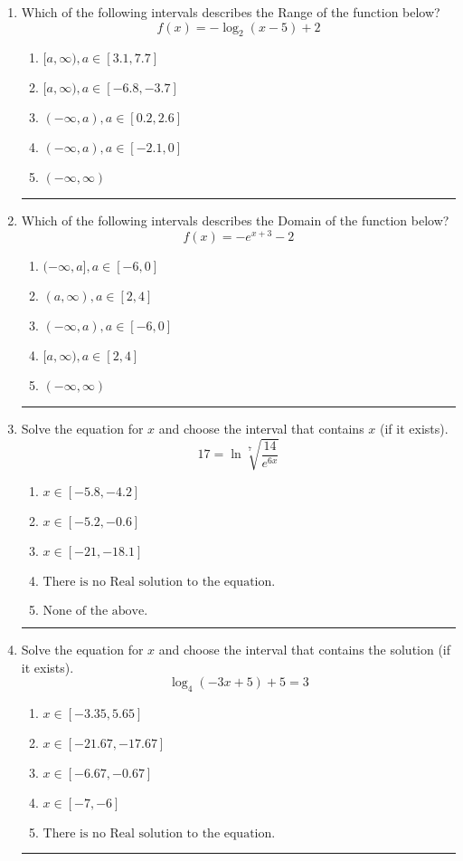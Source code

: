 \documentclass[14pt]{extbook}
\newcommand{\litem}[1]{\item#1\hspace*{-1cm}\rule{\textwidth}{0.4pt}}
\begin{document}
\begin{enumerate}
{\begin{enumerate}[label=\Alph*.]
\end{enumerate} }
\litem{
Which of the following intervals describes the Range of the function below?\[ f(x) = -\log_2{(x-5)}+2 \]\begin{enumerate}[label=\Alph*.]
\item \( [a, \infty), a \in [3.1, 7.7] \)
\item \( [a, \infty), a \in [-6.8, -3.7] \)
\item \( (-\infty, a), a \in [0.2, 2.6] \)
\item \( (-\infty, a), a \in [-2.1, 0] \)
\item \( (-\infty, \infty) \)

\end{enumerate} }
\litem{
Which of the following intervals describes the Domain of the function below?\[ f(x) = -e^{x+3}-2 \]\begin{enumerate}[label=\Alph*.]
\item \( (-\infty, a], a \in [-6, 0] \)
\item \( (a, \infty), a \in [2, 4] \)
\item \( (-\infty, a), a \in [-6, 0] \)
\item \( [a, \infty), a \in [2, 4] \)
\item \( (-\infty, \infty) \)

\end{enumerate} }
\litem{
 Solve the equation for $x$ and choose the interval that contains $x$ (if it exists).\[  17 = \ln{\sqrt[7]{\frac{14}{e^{6x}}}} \]\begin{enumerate}[label=\Alph*.]
\item \( x \in [-5.8, -4.2] \)
\item \( x \in [-5.2, -0.6] \)
\item \( x \in [-21, -18.1] \)
\item \( \text{There is no Real solution to the equation.} \)
\item \( \text{None of the above.} \)

\end{enumerate} }
\litem{
Solve the equation for $x$ and choose the interval that contains the solution (if it exists).\[ \log_{4}{(-3x+5)}+5 = 3 \]\begin{enumerate}[label=\Alph*.]
\item \( x \in [-3.35, 5.65] \)
\item \( x \in [-21.67, -17.67] \)
\item \( x \in [-6.67, -0.67] \)
\item \( x \in [-7, -6] \)
\item \( \text{There is no Real solution to the equation.} \)


\end{enumerate}}
\end{enumerate}
\end{document}
